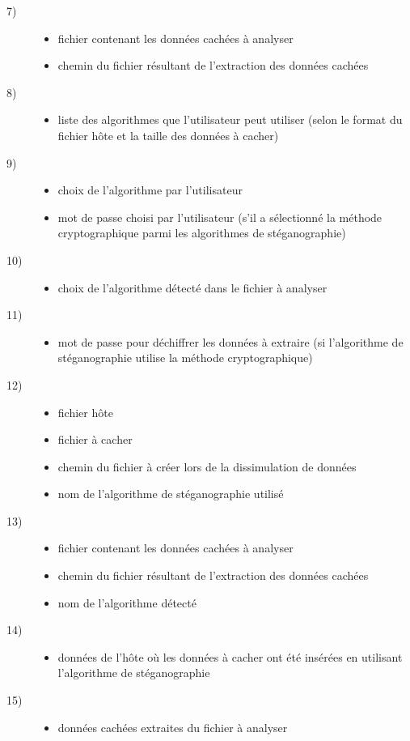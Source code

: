 \documentclass[11pt]{article}
\begin{document}
\begin{description}
\item[7)]
\begin{itemize}
\item fichier contenant les données cachées à analyser
\item chemin du fichier résultant de l'extraction des données cachées
\end{itemize}
\item[8)]
\begin{itemize}
\item liste des algorithmes que l'utilisateur peut utiliser (selon le format du fichier hôte et la taille des données à cacher)
\end{itemize}
\item[9)]
\begin{itemize}
\item choix de l'algorithme par l'utilisateur
\item mot de passe choisi par l'utilisateur (s'il a sélectionné la méthode cryptographique parmi les algorithmes de stéganographie)
\end{itemize}
\item[10)]
\begin{itemize}
\item choix de l'algorithme détecté dans le fichier à analyser
\end{itemize}
\item[11)]
\begin{itemize}
\item mot de passe pour déchiffrer les données à extraire (si l'algorithme de stéganographie utilise la méthode cryptographique)
\end{itemize}
\item[12)]
\begin{itemize}
\item fichier hôte
\item fichier à cacher
\item chemin du fichier à créer lors de la dissimulation de données
\item nom de l'algorithme de stéganographie utilisé
\end{itemize}
\item[13)]
\begin{itemize}
\item fichier contenant les données cachées à analyser 
\item chemin du fichier résultant de l'extraction des données cachées
\item nom de l'algorithme détecté
\end{itemize}
\item[14)]
\begin{itemize}
\item données de l'hôte où les données à cacher ont été insérées en utilisant l'algorithme de stéganographie
\end{itemize}
\item[15)]
\begin{itemize}
\item données cachées extraites du fichier à analyser
\end{itemize}
\end{description}
\end{document}
